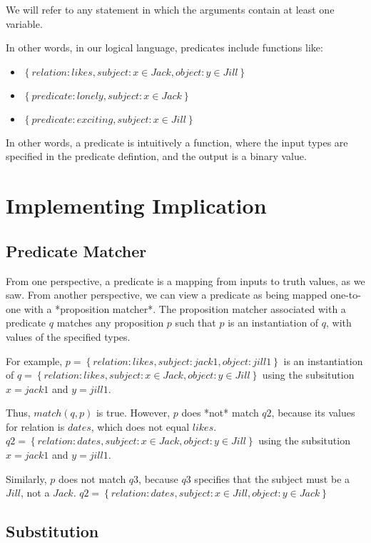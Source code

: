 \documentclass[12pt]{article}
\begin{document}
We will refer to any statement in which the arguments contain at least one variable.

In other words, in our logical language, predicates include functions like:
\begin{itemize}
\item $\left\{relation:likes, subject:{x \in Jack}, object:{y \in Jill} \right\}$
\item $\left\{predicate:lonely, subject:{x \in Jack} \right\}$
\item $\left\{predicate:exciting, subject:{x \in Jill} \right\}$
\end{itemize}

In other words, a predicate is intuitively a function, where the input types are specified in the predicate defintion, and the output is a binary value.


\section{Implementing Implication}
\subsection{Predicate Matcher}
From one perspective, a predicate is a mapping from inputs to truth values, as we saw.
From another perspective, we can view a predicate as being mapped one-to-one with a *proposition matcher*.
The proposition matcher associated with a predicate $q$ matches any proposition $p$ such that $p$ is an instantiation of $q$, with values of the specified types.

For example, 
$p = \left\{relation:likes, subject:jack1, object:jill1 \right\}$
is an instantiation of
$q = \left\{relation:likes, subject:{x \in Jack}, object:{y \in Jill} \right\}$
using the subsitution $x=jack1$ and $y=jill1$.

Thus, $match(q, p)$ is true.
However, $p$ does *not* match $q2$, because its values for relation is $dates$, which does not equal $likes$.
$q2 = \left\{relation:dates, subject:{x \in Jack}, object:{y \in Jill} \right\}$
using the subsitution $x=jack1$ and $y=jill1$.

Similarly, $p$ does not match $q3$, because $q3$ specifies that the subject must be a $Jill$, not a $Jack$.
$q2 = \left\{relation:dates, subject:{x \in Jill}, object:{y \in Jack} \right\}$

\subsection{Substitution}
\end{document}
